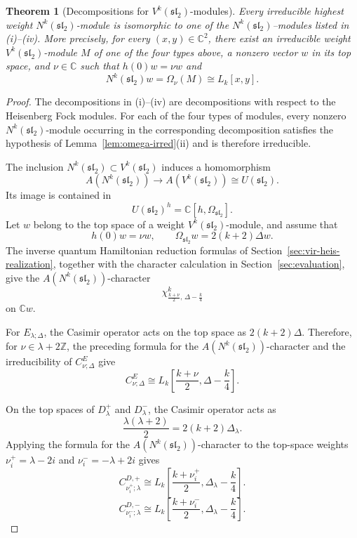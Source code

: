 \documentclass[11 pt]{amsart}
\newtheorem{theorem}{Theorem}
\theoremstyle{definition}
\theoremstyle{plain}
\begin{document}
\begin{theorem}[Decompositions for $V^k(\mathfrak{sl}_2)$-modules]
Every irreducible highest weight $N^k(\mathfrak{sl}_2)$-module is
isomorphic to one of the $N^k(\mathfrak{sl}_2)$--modules listed in
\textup{(i)--(iv)}. More precisely, for every $(x,y)\in\mathbb C^2$, there
exist an irreducible weight $V^k(\mathfrak{sl}_2)$-module $M$ of one of the
four types above, a nonzero vector $w$ in its top space, and
$\nu\in\mathbb C$ such that $h(0)w=\nu w$ and
\[
N^k(\mathfrak{sl}_2)w
=\Omega_{\nu}(M)
\cong L_k[x,y].
\]
\end{theorem}

\begin{proof}

The decompositions in \textup{(i)--(iv)} are decompositions with
respect to the Heisenberg Fock modules. For each of the four types of
modules, every nonzero $N^k(\mathfrak{sl}_2)$-module occurring in the
corresponding decomposition satisfies the hypothesis of
Lemma~\ref{lem:omega-irred}\textup{(ii)} and is therefore irreducible.




The inclusion $N^k(\mathfrak{sl}_2)\subset V^k(\mathfrak{sl}_2)$
induces a homomorphism
\[
 A(N^k(\mathfrak{sl}_2))
 \longrightarrow A(V^k(\mathfrak{sl}_2))
 \cong U(\mathfrak{sl}_2).
\]
Its image is contained in
\[
 U(\mathfrak{sl}_2)^h
 =\mathbb C[h,\Omega_{\mathfrak{sl}_2}].
\]
Let $w$ belong to the top space of a weight
$V^k(\mathfrak{sl}_2)$-module, and assume that
\[
 h(0)w=\nu w,\qquad
 \Omega_{\mathfrak{sl}_2}w=2(k+2)\Delta w.
\]
The inverse quantum Hamiltonian reduction formulas of
Section~\ref{sec:vir-heis-realization}, together with the character
calculation in Section~\ref{sec:evaluation}, give the
$A(N^k(\mathfrak{sl}_2))$-character
\[
 \chi^k_{\frac{k+\nu}{2},\,\Delta-\frac{k}{4}}
\]
on $\mathbb Cw$.

For $E_{\lambda;\Delta}$, the Casimir operator acts on the top space as
$2(k+2)\Delta$. Therefore, for
$\nu\in\lambda+2\mathbb Z$, the preceding formula for the
$A(N^k(\mathfrak{sl}_2))$-character and the
irreducibility of $C^E_{\nu;\Delta}$ give
\[
C^E_{\nu;\Delta}
\cong
L_k\left[\frac{k+\nu}{2},\Delta-\frac{k}{4}\right].
\]

On the top spaces of $D^+_\lambda$ and $D^-_\lambda$, the Casimir
operator acts as
\[
\frac{\lambda(\lambda+2)}{2}
=2(k+2)\Delta_\lambda.
\]
Applying the formula for the $A(N^k(\mathfrak{sl}_2))$-character to
the top-space weights
$\nu_i^+=\lambda-2i$ and $\nu_i^-=-\lambda+2i$ gives
\[
C^{D,+}_{\nu_i^+;\lambda}
\cong
L_k\left[\frac{k+\nu_i^+}{2},
\Delta_\lambda-\frac{k}{4}\right].
\]
\[
C^{D,-}_{\nu_i^-;\lambda}
\cong
L_k\left[\frac{k+\nu_i^-}{2},
\Delta_\lambda-\frac{k}{4}\right].
\]


\end{proof}
\end{document}
